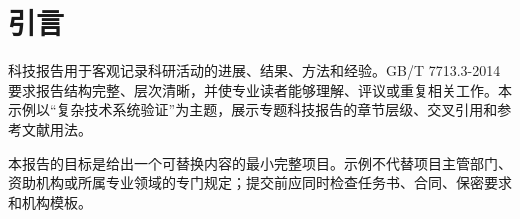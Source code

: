 \chapter{引言}

科技报告用于客观记录科研活动的进展、结果、方法和经验。GB/T 7713.3-2014 要求报告结构完整、层次清晰，并使专业读者能够理解、评议或重复相关工作\cite{gbt7713_3_2014}。本示例以“复杂技术系统验证”为主题，展示专题科技报告的章节层级、交叉引用和参考文献用法。

本报告的目标是给出一个可替换内容的最小完整项目。示例不代替项目主管部门、资助机构或所属专业领域的专门规定；提交前应同时检查任务书、合同、保密要求和机构模板。
